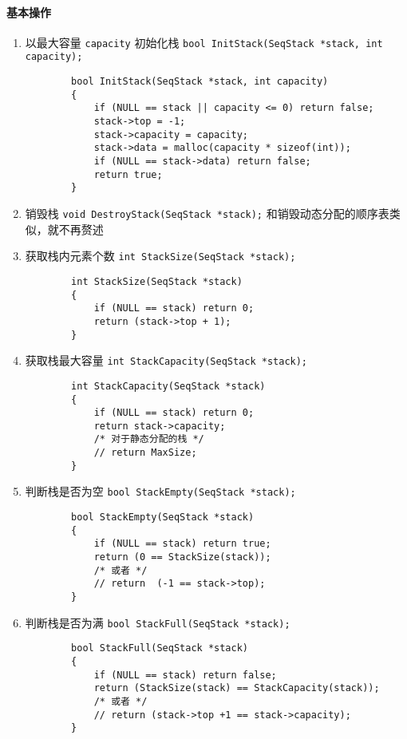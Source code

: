 \documentclass{ctexart}
\begin{document}
\paragraph{基本操作}
\begin{enumerate}
    \item 以最大容量 \texttt{capacity} 初始化栈 \texttt{bool InitStack(SeqStack *stack, int capacity);}
        \begin{verbatim}
        bool InitStack(SeqStack *stack, int capacity)
        {
            if (NULL == stack || capacity <= 0) return false;
            stack->top = -1;
            stack->capacity = capacity;
            stack->data = malloc(capacity * sizeof(int));
            if (NULL == stack->data) return false;
            return true;
        }
        \end{verbatim}

    \item 销毁栈 \texttt{void DestroyStack(SeqStack *stack);} 和销毁动态分配的顺序表类似，就不再赘述

    \item 获取栈内元素个数 \texttt{int StackSize(SeqStack *stack);}
        \begin{verbatim}
        int StackSize(SeqStack *stack)
        {
            if (NULL == stack) return 0;
            return (stack->top + 1);
        }
        \end{verbatim}

    \item 获取栈最大容量 \texttt{int StackCapacity(SeqStack *stack);}
        \begin{verbatim}
        int StackCapacity(SeqStack *stack)
        {
            if (NULL == stack) return 0;
            return stack->capacity;
            /* 对于静态分配的栈 */
            // return MaxSize;
        }
        \end{verbatim}

    \item 判断栈是否为空 \texttt{bool StackEmpty(SeqStack *stack);}
        \begin{verbatim}
        bool StackEmpty(SeqStack *stack)
        {
            if (NULL == stack) return true;
            return (0 == StackSize(stack));
            /* 或者 */
            // return  (-1 == stack->top);
        }
        \end{verbatim}

    \item 判断栈是否为满 \texttt{bool StackFull(SeqStack *stack);}
        \begin{verbatim}
        bool StackFull(SeqStack *stack)
        {
            if (NULL == stack) return false;
            return (StackSize(stack) == StackCapacity(stack));
            /* 或者 */
            // return (stack->top +1 == stack->capacity);
        }
        \end{verbatim}


\end{enumerate}
\end{document}
